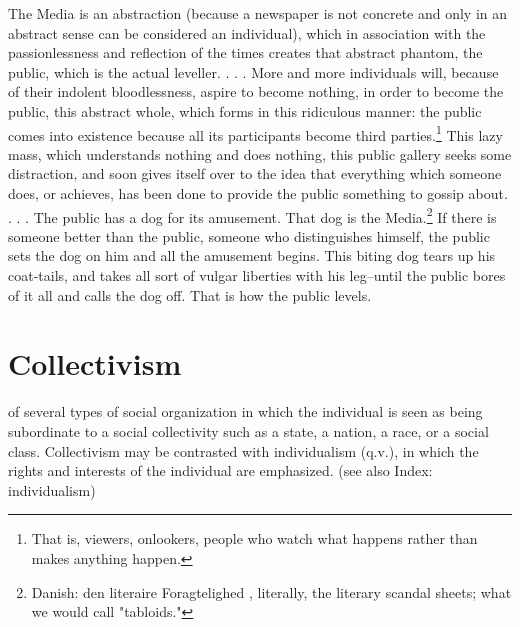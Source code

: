 \documentclass[12pt]{article}
\begin{document}
   The Media is an abstraction (because a newspaper is not concrete and
only in an abstract sense can be considered an individual), which in
association with the passionlessness and reflection of the times creates
that abstract phantom, the public, which is the actual leveller. . . . More
and more individuals will, because of their indolent bloodlessness, aspire
to become nothing, in order to become the public, this abstract whole, which
forms in this ridiculous manner: the public comes into existence because all
its participants become third parties.\footnote{That is, viewers, onlookers, people who watch what happens rather than
makes anything happen.} This lazy mass, which understands
nothing and does nothing, this public gallery seeks some distraction, and
soon gives itself over to the idea that everything which someone does, or
achieves, has been done to provide the public something to gossip about. . .
. The public has a dog for its amusement. That dog is the 
Media.\footnote{Danish: den literaire Foragtelighed , literally, the literary scandal
sheets; what we would call "tabloids."} If there
is someone better than the public, someone who distinguishes himself, the
public sets the dog on him and all the amusement begins. This biting dog
tears up his coat-tails, and takes all sort of vulgar liberties with his
leg--until the public bores of it all and calls the dog off. That is how the
public levels.

                                     
\section{Collectivism}
 of several types of social organization in which the individual is
                                      seen as being subordinate to a social collectivity such as a state, a
                                      nation, a race, or a social class. Collectivism may be contrasted with
                                      individualism (q.v.), in which the rights and interests of the
                                      individual are emphasized. (see also Index: individualism) 
\end{document}
